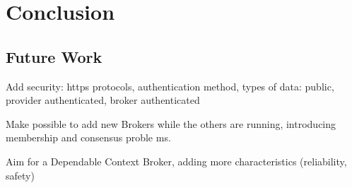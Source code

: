 \chapter{Conclusion}
\label{chap:conclusion}

\section{Future Work}
Add security: https protocols, authentication method, types of data: public, provider authenticated, broker authenticated

Make possible to add new Brokers while the others are running, introducing membership and consensus proble ms.

Aim for a Dependable Context Broker, adding more characteristics (reliability, safety)